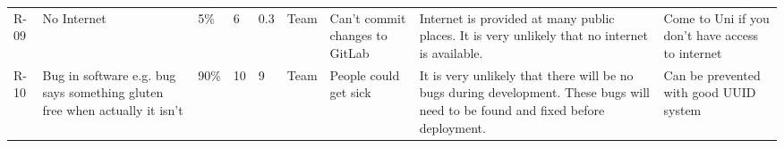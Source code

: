 \begin{tabular}{lllllllll}
R-09 & No Internet                                                                & 5\%                                                            & 6                                                        & 0.3                                                          & Team                & Can’t commit changes to GitLab                                                               & Internet is provided at many public places. It is very unlikely that no internet is available.                                                                                                                                                                         & Come to Uni if you don’t have access to internet                                                 \\
R-10 & Bug in software e.g. bug says something gluten free when actually it isn’t & 90\%                                                           & 10                                                       & 9                                                            & Team                & People could get sick                                                                        & It is very unlikely that there will be no bugs during development. These bugs will need to be found and fixed before deployment.                                                                                                                                       & Can be prevented with good UUID system
\end{tabular}